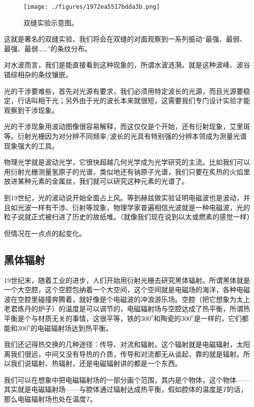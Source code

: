 \begin{figure}[ht]
\centering
\texttt{[image: ./figures/1972ea5517bdda3b.png]}
\caption{双缝实验示意图。} \label{fig_QMPre5_6}
\end{figure}

这就是著名的双缝实验，我们将会在双缝的对面观察到一系列振动“最强、最弱、最强、最弱……”的条纹分布。

对水波而言，我们是能直接看到这种现象的，所谓水波涟漪。就是这种波峰、波谷错综相杂的条纹镶嵌。

光的干涉要难些，首先对光源有要求，我们必须用特定波长的光源，而且光源要稳定，行话叫相干光；另外由于光的波长本来就很短，这需要我们专门设计实验才能观察到干涉现象。

光的干涉现象用波动图像很容易解释，而这仅仅是个开始，还有衍射现象，艾里斑等。衍射光栅因为对分辨不同频率/波长的光具有特别强的分辨本领成为测量光谱现象强大的工具。

物理光学就是波动光学，它很快超越几何光学成为光学研究的主流。比如我们可以用衍射光栅测量氢原子的光谱，类似地还有钠原子光谱，我们只要在炙热的火焰里放进某种元素的金属丝，我们就可以研究这种元素的光谱了。

到19世纪，光的波动说开始全面占上风。等到赫兹做实验证明电磁波也是波动，并且如光波一样有干涉、衍射等现象，物理学家普遍相信光波就是一种电磁波，光的粒子说就正式被扫进了历史的故纸堆。（就像我们现在说到以太或燃素的感觉一样）

但情况在一点点的起变化。

\subsection{黑体辐射}

19世纪末，随着工业的进步，人们开始用衍射光栅去研究黑体辐射。所谓黑体就是一个大空腔，这个空腔包纳着一个大空间，这个空间就是电磁场的海洋，各种电磁波在空腔里碰撞奔腾着，就好像是个电磁波的冲浪游乐场。空腔（把它想象为太上老君炼丹的炉子）的温度是可以调节的，电磁辐射场与空腔达成了热平衡，所谓热平衡是个与材质无关的事情，这很平等，铁的$300^o$和陶瓷的$300^o$是一样的，它们都能和$300^o$的电磁辐射场达到热平衡。

我们还记得热交换的几种途径：传导、对流和辐射。这个辐射就是电磁辐射，太阳离我们很远，中间又没有导热的介质，传导和对流都无从谈起，靠的就是辐射。所以我们说辐射、热辐射，还是电磁辐射讲的都是一个东西。

我们可以在想象中把电磁辐射场的一部分画个范围，其内是个物体，这个物体——其实就是电磁辐射场——与腔体通过辐射达成热平衡，假如腔体的温度是$T$的话，那么电磁辐射场也处在温度$T$。

